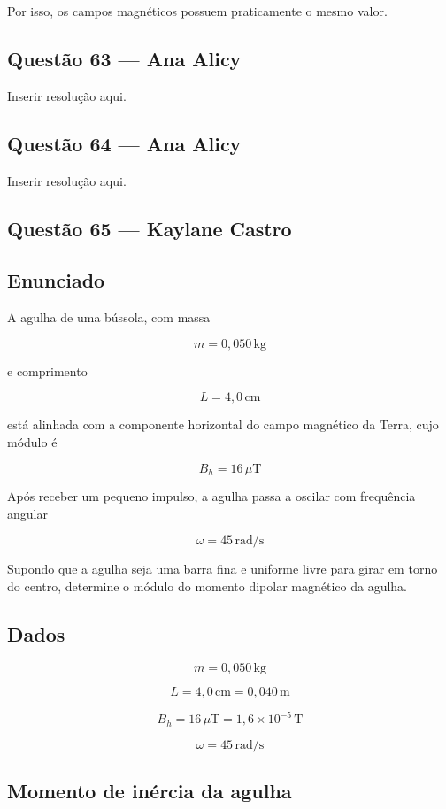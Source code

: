 \documentclass[12pt,a4paper]{article}
\begin{document}
Por isso, os campos magnéticos possuem praticamente o mesmo valor.


\subsection{Questão 63 — Ana Alicy}
Inserir resolução aqui.

\subsection{Questão 64 — Ana Alicy}
Inserir resolução aqui.

\subsection{Questão 65 — Kaylane Castro}

\subsection*{Enunciado}

A agulha de uma bússola, com massa

\[
m = 0,050\,\text{kg}
\]

e comprimento

\[
L = 4,0\,\text{cm}
\]

está alinhada com a componente horizontal do campo magnético da Terra,
cujo módulo é

\[
B_h = 16\,\mu\text{T}
\]

Após receber um pequeno impulso, a agulha passa a oscilar com frequência angular

\[
\omega = 45\,\text{rad/s}
\]

Supondo que a agulha seja uma barra fina e uniforme livre para girar
em torno do centro, determine o módulo do momento dipolar magnético
da agulha.


\subsection*{Dados}

\[
m = 0,050\,\text{kg}
\]

\[
L = 4,0\,\text{cm} = 0,040\,\text{m}
\]

\[
B_h = 16\,\mu\text{T} = 1,6\times10^{-5}\,\text{T}
\]

\[
\omega = 45\,\text{rad/s}
\]


\subsection*{Momento de inércia da agulha}
\end{document}
